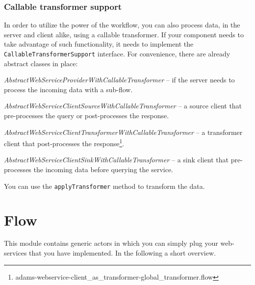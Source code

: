 \documentclass[a4paper]{book}
\begin{document}
\subsection{Callable transformer support}
\label{webservice_global_transformer}
In order to utilize the power of the workflow, you can also process data,
in the server and client alike, using a callable transformer.
If your component needs to take advantage of such functionality, it needs to
implement the \texttt{CallableTransformerSupport} interface. For convenience,
there are already abstract classes in place:
\begin{tight_itemize}
	\item \textit{AbstractWebServiceProviderWithCallableTransformer} -- if the server needs
	to process the incoming data with a sub-flow.
	\item \textit{AbstractWebServiceClientSourceWithCallableTransformer} -- a 
	source client that pre-processes the query or post-processes the response.
	\item \textit{AbstractWebServiceClientTransformerWithCallableTransformer} --
	a transformer client that post-processes the 
	response\footnote{adams-webservice-client\_as\_transformer-global\_transformer.flow}.
	\item \textit{AbstractWebServiceClientSinkWithCallableTransformer} -- a
	sink client that pre-processes the incoming data before querying the service.
\end{tight_itemize}
You can use the \texttt{applyTransformer} method to transform the data.

\chapter{Flow}
This module contains generic actors in which you can simply plug your 
web-services that you have implemented. In the following a short overview.
\end{document}
